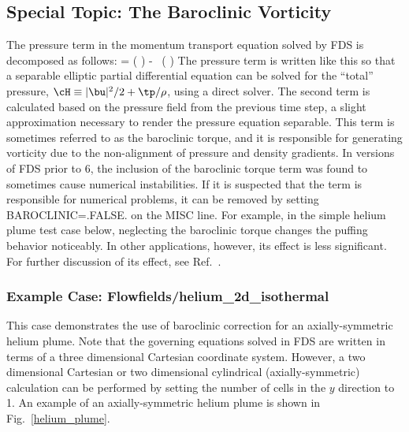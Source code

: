 \documentclass[11pt]{book}
\begin{document}
\subsection{Special Topic: The Baroclinic Vorticity}
\label{baroclinic_torque}

The pressure term in the momentum transport equation solved by FDS is decomposed as follows:
\be
    \nabla \tp = \nabla \left( \frac{\tp}{\rho}\right) - \tp \, \nabla \left( \right)
\ee
The pressure term is written like this so that a separable elliptic partial differential equation can be solved for the ``total'' pressure, $\cH \equiv |\bu|^2/2 + \tp/\rho$, using a direct solver. The second term is calculated based on the pressure field from the previous time step, a slight approximation necessary to render the pressure equation separable. This term is sometimes referred to as the baroclinic torque, and it is responsible for generating vorticity due to the non-alignment of pressure and density gradients. In versions of FDS prior to 6, the inclusion of the baroclinic torque term was found to sometimes cause numerical instabilities. If it is suspected that the term is responsible for numerical problems, it can be removed by setting {\ct BAROCLINIC=.FALSE.} on the {\ct MISC} line. For example, in the simple helium plume test case below, neglecting the baroclinic torque changes the puffing behavior noticeably. In other applications, however, its effect is less significant. For further discussion of its effect, see Ref.~\cite{Xin:JSS2005}.



\subsubsection{Example Case: Flowfields/helium\_2d\_isothermal}
\label{helium_2d_isothermal}

This case demonstrates the use of baroclinic correction for an axially-symmetric helium plume. Note that the governing equations solved in FDS are written in terms of a three dimensional Cartesian coordinate system. However, a two dimensional Cartesian or two dimensional cylindrical (axially-symmetric) calculation can be performed by setting the number of cells in the $y$ direction to 1. An example of an axially-symmetric helium plume is shown in Fig.~\ref{helium_plume}.
\end{document}
